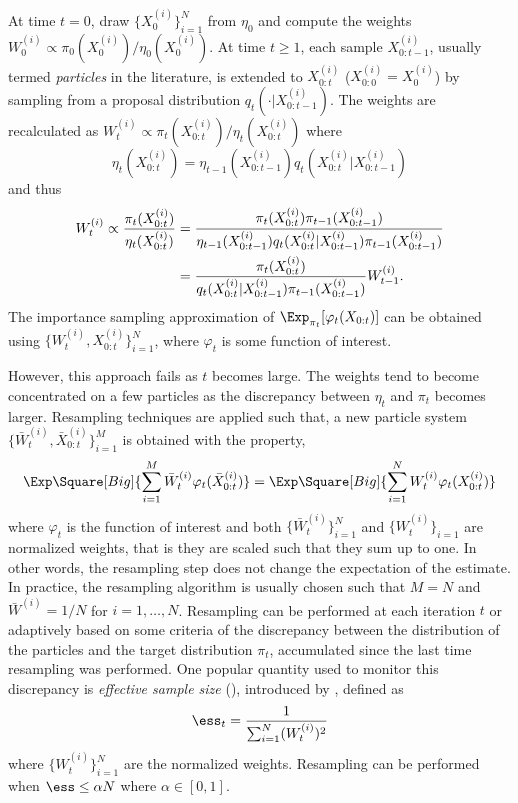 At time $t = 0$, draw $\{X_0^{(i)}\}_{i=1}^N$ from $\eta_0$ and compute the weights $W_0^{(i)} \propto \pi_0(X_0^{(i)})/\eta_0(X_0^{(i)})$. At time $t\ge1$, each sample $X_{0:t-1}^{(i)}$, usually termed \emph{particles} in the literature, is extended to $X_{0:t}^{(i)}$ ($X_{0:0}^{(i)} = X_0^{(i)}$) by sampling from a proposal distribution $q_t(\cdot|X_{0:t-1}^{(i)})$. The weights are recalculated as $W_t^{(i)} \propto \pi_t(X_{0:t}^{(i)})/\eta_t(X_{0:t}^{(i)})$ where
\begin{equation}
  \eta_t(X_{0:t}^{(i)}) =
  \eta_{t-1}(X_{0:t-1}^{(i)})q_t(X_{0:t}^{(i)}|X_{0:t-1}^{(i)})
\end{equation}
and thus
\begin{align}
  W_t^{(i)} \propto \frac{\pi_t(X_{0:t}^{(i)})}{\eta_t(X_{0:t}^{(i)})}
  &= \frac{\pi_t(X_{0:t}^{(i)})\pi_{t-1}(X_{0:t-1}^{(i)})}
  {\eta_{t-1}(X_{0:t-1}^{(i)})q_t(X_{0:t}^{(i)}|X_{0:t-1}^{(i)})
    \pi_{t-1}(X_{0:t-1}^{(i)})} \notag\\
  &= \frac{\pi_t(X_{0:t}^{(i)})}
  {q_t(X_{0:t}^{(i)}|X_{0:t-1}^{(i)})\pi_{t-1}(X_{0:t-1}^{(i)})}W_{t-1}^{(i)}.
  \label{eq:si}
\end{align}
The importance sampling approximation of $\Exp_{\pi_t}[\varphi_t(X_{0:t})]$ can be obtained using $\{W_t^{(i)},X_{0:t}^{(i)}\}_{i=1}^N$, where $\varphi_t$ is some function of interest.

However, this approach fails as $t$ becomes large. The weights tend to become concentrated on a few particles as the discrepancy between $\eta_t$ and $\pi_t$ becomes larger. Resampling techniques are applied such that, a new particle system $\{\bar{W}_t^{(i)},\bar{X}_{0:t}^{(i)}\}_{i=1}^M$ is obtained with the property,
\begin{equation}
  \Exp\Square[Big]{\sum_{i=1}^M\bar{W}_t^{(i)}\varphi_t(\bar{X}_{0:t}^{(i)})}
  = \Exp\Square[Big]{\sum_{i=1}^NW_t^{(i)}\varphi_t(X_{0:t}^{(i)})}
  \label{eq:resample}
\end{equation}
where $\varphi_t$ is the function of interest and both $\{\bar{W}_t^{(i)}\}_{i=1}^N$ and $\{W_t^{(i)}\}_{i=1}$ are normalized weights, that is they are scaled such that they sum up to one. In other words, the resampling step does not change the expectation of the estimate. In practice, the resampling algorithm is usually chosen such that $M = N$ and $\bar{W}^{(i)} = 1/N$ for $i=1,\dots,N$. Resampling can be performed at each iteration $t$ or adaptively based on some criteria of the discrepancy between the distribution of the particles and the target distribution $\pi_t$, accumulated since the last time resampling was performed. One popular quantity used to monitor this discrepancy is \emph{effective sample size} (\ess), introduced by \cite{Liu:1998iu}, defined as
\begin{equation}
  \ess_t = \frac{1}{\sum_{i=1}^N (W_t^{(i)})^2}
\end{equation}
where $\{W_t^{(i)}\}_{i=1}^N$ are the normalized weights. Resampling can be performed when $\ess\le \alpha N$ where $\alpha\in[0,1]$.

